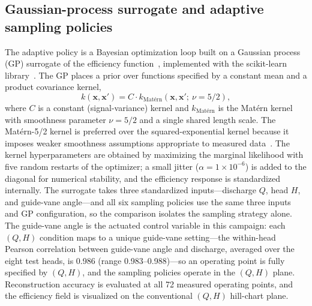 \documentclass[preprint,12pt]{elsarticle}
\begin{document}
\subsection{Gaussian-process surrogate and adaptive sampling policies}
The adaptive policy is a Bayesian optimization loop built on a Gaussian process (GP)
surrogate of the efficiency function~\cite{rasmussen2006gpml}, implemented with the
scikit-learn library~\cite{pedregosa2011sklearn}. The GP places a prior over functions
specified by a constant mean and a product covariance kernel,
\begin{equation}
k(\mathbf{x}, \mathbf{x}') = C \cdot k_{\text{Mat\'ern}}(\mathbf{x}, \mathbf{x}';\ \nu = 5/2),
\label{eq:kernel}
\end{equation}
where $C$ is a constant (signal-variance) kernel and $k_{\text{Mat\'ern}}$ is the
Mat\'ern kernel with smoothness parameter $\nu = 5/2$ and a single shared length
scale. The Mat\'ern-5/2 kernel is preferred over the squared-exponential kernel
because it imposes weaker smoothness assumptions appropriate to measured
data~\cite{palar2020compositekernel}. The kernel hyperparameters are obtained by
maximizing the marginal likelihood with five random restarts of the optimizer; a small
jitter ($\alpha = 1\times10^{-6}$) is added to the diagonal for numerical stability,
and the efficiency response is standardized internally. The surrogate takes three
standardized inputs---discharge $Q$, head $H$, and guide-vane angle---and all six
sampling policies use the same three inputs and GP configuration, so the comparison
isolates the sampling strategy alone. The guide-vane angle is the actuated control
variable in this campaign: each $(Q, H)$ condition maps to a unique guide-vane
setting---the within-head Pearson correlation between guide-vane angle and discharge,
averaged over the eight test heads, is 0.986 (range 0.983--0.988)---so an operating
point is fully specified by $(Q, H)$, and the sampling policies operate in the
$(Q, H)$ plane. Reconstruction accuracy is evaluated at all 72 measured operating
points, and the efficiency field is visualized on the conventional $(Q, H)$
hill-chart plane.
\end{document}
